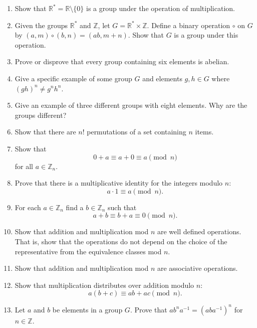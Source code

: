 \documentclass[12pt,reqno]{amsart}
\begin{document}
\begin{enumerate}[{\bf 1.}]
 
\item
Show that ${\mathbb R}^{\ast} = {\mathbb R} \setminus \{0 \}$ is a group
under the operation of multiplication. 
 
 
\item
Given the groups  ${\mathbb R}^{\ast}$ and ${\mathbb Z}$, let $G = {\mathbb
R}^{\ast}  \times {\mathbb Z}$. Define a binary operation $\circ$ on $G$
by $(a,m) \circ (b,n) = (ab, m+n)$. Show that $G$ is a group under
this operation. 
 
 
\item
Prove or disprove that every group containing six elements is abelian.
 
 
\item
Give a specific example of some group $G$ and elements $g, h \in G$
where $(gh)^n \neq g^nh^n$. 
 
 
\item %
Give an example of three different groups with eight elements.  Why
are the groups different? 
 
 
\item
Show that there are $n!$ permutations of a set containing $n$ items. 
 
 
\item
Show that 
\[
0 + a  \equiv a + 0  \equiv a \pmod{ n }
\]
for all $a \in {\mathbb Z}_n$.
 
 
\item
Prove that there is  a multiplicative identity for the integers modulo
$n$: 
\[
a \cdot  1   \equiv  a \pmod{ n}.
\]
 
 
\item
For each $a \in {\mathbb Z}_n$ find a $b \in {\mathbb Z}_n$ such that
\[
a+b \equiv b+a  \equiv 0 \pmod{ n}.
\]
 
 
\item
Show that addition and multiplication mod $n$ are well defined operations.  That is, show that the operations do not depend on the choice of the representative from the equivalence classes mod $n$.

 
 
\item
Show that addition and multiplication mod $n$ are associative
operations. 
 
 
\item
Show that multiplication distributes over addition modulo $n$:
\[
a  (b  + c)  \equiv a  b + a  c  \pmod{ n}.
\]
 
 
\item
Let $a$ and $b$ be elements in a group $G$.  Prove that $ab^na^{-1} =
(aba^{-1})^n$ for $n \in \mathbb Z$. 
 

\end{enumerate}
\end{document}
